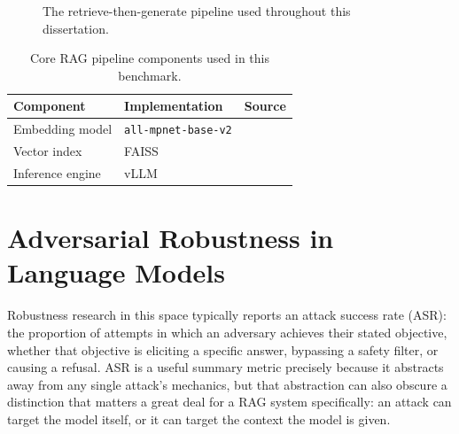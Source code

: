\begin{figure}[htbp]
\centering
{}
\caption{The retrieve-then-generate pipeline used throughout this dissertation.}
\label{fig:rag-pipeline}
\end{figure}

\begin{table}[htbp]
\centering
\begin{tabular}{lll}
\toprule
\textbf{Component} & \textbf{Implementation} & \textbf{Source} \\
\midrule
Embedding model & \texttt{all-mpnet-base-v2} & \cite{reimers2019sentencebert, song2020mpnet} \\
Vector index & FAISS & \cite{johnson2021billionscale} \\
Inference engine & vLLM & \cite{kwon2023efficient} \\
\bottomrule
\end{tabular}
\caption{Core RAG pipeline components used in this benchmark.}
\label{tab:rag-components}
\end{table}

\section{Adversarial Robustness in Language Models}

Robustness research in this space typically reports an attack success
rate (ASR): the proportion of attempts in which an adversary achieves
their stated objective, whether that objective is eliciting a specific
answer, bypassing a safety filter, or causing a refusal. ASR is a useful
summary metric precisely because it abstracts away from any single
attack's mechanics, but that abstraction can also obscure a distinction
that matters a great deal for a RAG system specifically: an attack can
target the model itself, or it can target the context the model is
given.

